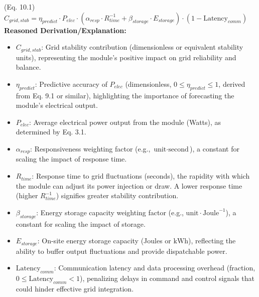 \documentclass{article}
\newenvironment{reasonedderivation}{
    \textbf{Reasoned Derivation/Explanation:}
    \begin{itemize}
}{
    \end{itemize}
}
\begin{document}
(Eq. 10.1) $C_{grid, stab} = \eta_{predict} \cdot P_{elec} \cdot (\alpha_{resp} \cdot R_{time}^{-1} + \beta_{storage} \cdot E_{storage}) \cdot (1 - \text{Latency}_{comm})$
\begin{reasonedderivation}
    \item $C_{grid, stab}$: Grid stability contribution (dimensionless or equivalent stability units), representing the module's positive impact on grid reliability and balance.
    \item $\eta_{predict}$: Predictive accuracy of $P_{elec}$ (dimensionless, $0 \le \eta_{predict} \le 1$, derived from Eq. 9.1 or similar), highlighting the importance of forecasting the module's electrical output.
    \item $P_{elec}$: Average electrical power output from the module (Watts), as determined by Eq. 3.1.
    \item $\alpha_{resp}$: Responsiveness weighting factor (e.g., $\text{unit} \cdot \text{second}$), a constant for scaling the impact of response time.
    \item $R_{time}$: Response time to grid fluctuations (seconds), the rapidity with which the module can adjust its power injection or draw. A lower response time (higher $R_{time}^{-1}$) signifies greater stability contribution.
    \item $\beta_{storage}$: Energy storage capacity weighting factor (e.g., $\text{unit} \cdot \text{Joule}^{-1}$), a constant for scaling the impact of storage.
    \item $E_{storage}$: On-site energy storage capacity (Joules or $\text{kWh}$), reflecting the ability to buffer output fluctuations and provide dispatchable power.
    \item $\text{Latency}_{comm}$: Communication latency and data processing overhead (fraction, $0 \le \text{Latency}_{comm} < 1$), penalizing delays in command and control signals that could hinder effective grid integration.
\end{reasonedderivation}
\end{document}
